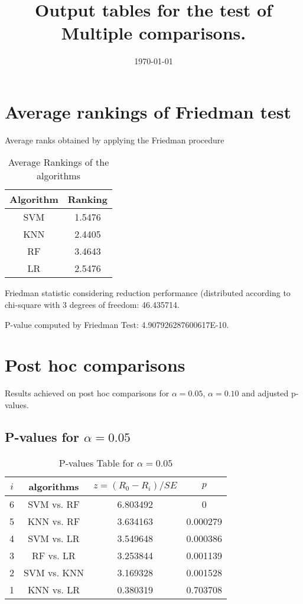 \documentclass[a4paper,10pt]{article}
\title{Output tables for the test of Multiple comparisons.}
\author{}
\date{\today}
\begin{document}
\begin{landscape}
\pagestyle{empty}
\maketitle
\thispagestyle{empty}
\section{Average rankings of Friedman test}



Average ranks obtained by applying the Friedman procedure

\begin{table}[!htp]
\centering
\begin{tabular}{|c|c|}\hline
Algorithm&Ranking\\\hline
SVM & 1.5476\\
KNN & 2.4405\\
RF & 3.4643\\
LR & 2.5476\\
\hline
\end{tabular}
\caption{Average Rankings of the algorithms}
\end{table}

Friedman statistic considering reduction performance (distributed according to chi-square with 3 degrees of freedom: 46.435714.

P-value computed by Friedman Test: 4.907926287600617E-10.\newline



\pagebreak

\section{Post hoc comparisons}

Results achieved on post hoc comparisons for $\alpha = 0.05$, $\alpha = 0.10$ and adjusted p-values.

\subsection{P-values for $\alpha=0.05$}

\begin{table}[!htp]
\centering\scriptsize
\begin{tabular}{cccc}
$i$&algorithms&$z=(R_0 - R_i)/SE$&$p$\\
\hline6&SVM vs. RF&6.803492&0\\
5&KNN vs. RF&3.634163&0.000279\\
4&SVM vs. LR&3.549648&0.000386\\
3&RF vs. LR&3.253844&0.001139\\
2&SVM vs. KNN&3.169328&0.001528\\
1&KNN vs. LR&0.380319&0.703708\\
\hline
\end{tabular}
\caption{P-values Table for $\alpha=0.05$}
\end{table}\pagebreak


\end{landscape}
\end{document}
